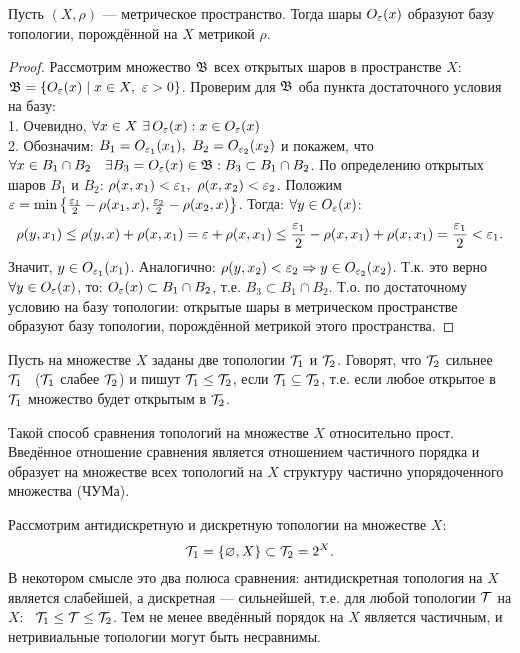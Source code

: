 \begin{theorem}\label{T:Base_of_Metric}
    Пусть $(X, \rho)$ --- метрическое пространство. Тогда шары $O_{\varepsilon}(x)$ образуют базу топологии, порождённой на $X$ метрикой $\rho$.
\end{theorem}
\begin{proof}
    Рассмотрим множество $\mathfrak{B}$ всех открытых шаров в пространстве $X$: \quad $\mfB = \cbr{O_{\veps}(x) \mid x \in X, \ \veps > 0}$. Проверим для $\mathfrak{B}$ оба пункта достаточного условия на базу: \\
    1. Очевидно, $\forall x \in X \ \exists \, O_{\varepsilon}(x) : x \in O_{\varepsilon}(x)$ \\
    2. Обозначим: $B_1 = O_{\varepsilon_1}(x_1), \ B_2 = O_{\varepsilon_2}(x_2)$ и покажем, что $\forall x \in B_1 \cap B_2 \quad \exists B_3 = O_{\varepsilon}(x) \in \mathfrak{B}: B_3 \subset B_1 \cap B_2$. По определению открытых шаров $B_1$ и $B_2$:
    $\rho(x, x_1) < \varepsilon_1, \ \rho(x, x_2) < \varepsilon_2$. Положим $\varepsilon = \min\left\{\frac{\varepsilon_1}{2} - \rho(x_1, x), \frac{\varepsilon_2}{2} - \rho(x_2, x)\right\}$. Тогда: $\forall y \in O_{\varepsilon}(x)$:
    \[
        \rho(y, x_1) \leq \rho(y, x) + \rho(x, x_1) = \varepsilon + \rho(x, x_1) \leq \frac{\varepsilon_1}{2} - \rho(x, x_1) + \rho(x, x_1) = \frac{\varepsilon_1}{2} < \varepsilon_1.
    \]
    Значит, $y \in O_{\varepsilon_1}(x_1)$. Аналогично: $\rho(y, x_2) < \varepsilon_2 \Rightarrow y \in O_{\varepsilon_2}(x_2)$. Т.к. это верно $\forall y \in O_{\varepsilon}(x)$, то: $O_{\varepsilon}(x) \subset B_1 \cap B_2$, т.е. $B_3 \subset B_1 \cap B_2$.
    Т.о. по достаточному условию на базу топологии: открытые шары в метрическом пространстве образуют базу топологии, порождённой метрикой этого пространства.
\end{proof}

\begin{definition}
    Пусть на множестве $X$ заданы две топологии $\mathcal{T}_1$ и $\mathcal{T}_2$. Говорят, что $\mathcal{T}_2$ сильнее $\mathcal{T}_1$ \ ($\mathcal{T}_1$ слабее $\mathcal{T}_2$) и пишут $\mathcal{T}_1 \leq \mathcal{T}_2$, если $\mathcal{T}_1 \subseteq \mathcal{T}_2$, т.е. если любое открытое в $\mathcal{T}_1$ множество будет открытым в $\mathcal{T}_2$.
\end{definition}
Такой способ сравнения топологий на множестве $X$ относительно прост. Введённое отношение сравнения является отношением частичного порядка и образует на множестве всех топологий на $X$ структуру частично упорядоченного множества (ЧУМа).

\begin{example}
    Рассмотрим антидискретную и дискретную топологии на множестве $X$: 
    \[
        \mathcal{T}_1 = \left\{\varnothing, X\right\} \subset \mathcal{T}_2 = 2^{X}.
    \]
    В некотором смысле это два полюса сравнения: антидискретная топология на $X$ является слабейшей, а дискретная --- сильнейшей, т.е. для любой топологии $\mathcal{T}$ на $X$: \, $\mathcal{T}_1 \leq \mathcal{T} \leq \mathcal{T}_2$. Тем не менее введённый порядок на $X$ является частичным, и нетривиальные топологии могут быть несравнимы.
\end{example}

